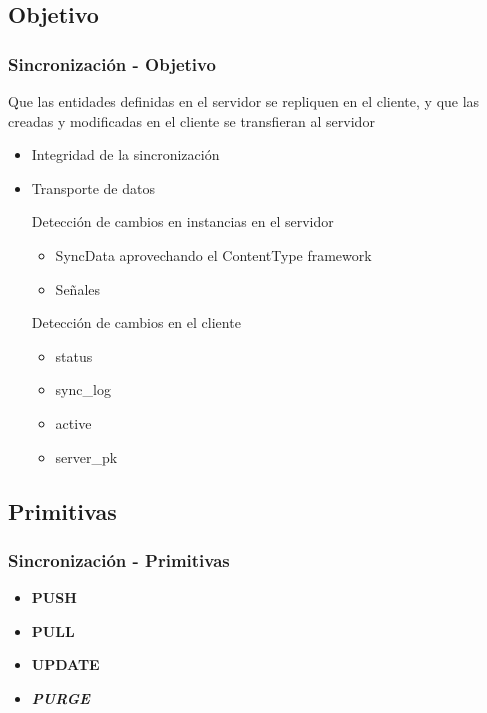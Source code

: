 \documentclass{beamer}
\begin{document}
\subsection{Objetivo}
\begin{frame}
    \frametitle{Sincronización - Objetivo}
    \par {
    	Que las entidades definidas en el servidor se repliquen en el cliente, y
    	que las creadas y modificadas en el cliente se transfieran al servidor
    }
    \begin{itemize}
        \item{Integridad de la sincronización}
		\item{Transporte de datos}
		\begin{item}
          \par{Detección de cambios en instancias en el servidor}
		  \begin{itemize}
            \item{SyncData aprovechando el ContentType framework}
            \item{Señales}
          \end{itemize}
		\end{item}

        \begin{item}
          \par{Detección de cambios en el cliente}
          \begin{itemize}
                \item{status}
                \item{sync\_log}
                \item{active}
                \item{server\_pk}
          \end{itemize}
        \end{item}
        
    \end{itemize}
\end{frame}

\subsection{Primitivas}
\begin{frame}
    \frametitle{Sincronización - Primitivas}
    

        \begin{itemize}
            \item {\bf PUSH}
            \item {\bf PULL}
            \item {\bf UPDATE}
            \item \textit{\bf PURGE}
        \end{itemize}
        
    
\end{frame}
\end{document}
